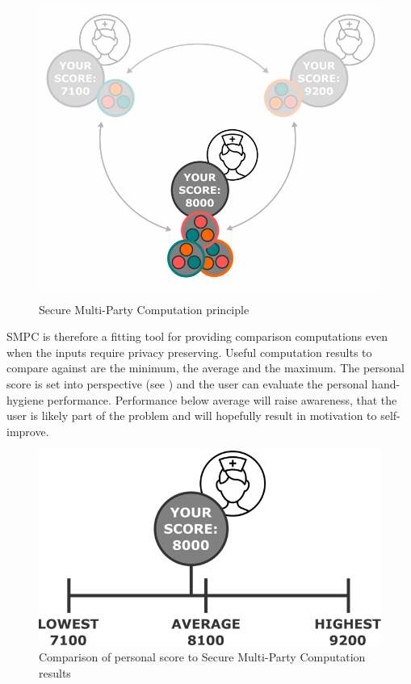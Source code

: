 \begin{figure}[!htb]
{		\includegraphics[scale=1.0]{figures/smpc_principle_e.png}
		\label{figure:Secure Multi-Party Computation principle - e}
	}%
	\hfill

	\caption{Secure Multi-Party Computation principle\protect\footnotemark} \label{figure:Secure Multi-Party Computation principle}
\end{figure}


\gls{SMPC} is therefore a fitting tool for providing comparison computations even when the inputs require privacy preserving. Useful computation results to compare against are the minimum, the average and the maximum. The personal score is set into perspective (see ) and the user can evaluate the personal hand-hygiene performance. Performance below average will raise awareness, that the user is likely part of the problem and will hopefully result in motivation to self-improve.

\begin{figure}[!htb] %
	\caption[Comparison of SMPC result and personal score]{Comparison of personal score to Secure Multi-Party Computation results} \label{figure:Secure Multi-Party Computation principle result}
	\includegraphics[scale=1.0]{figures/smpc_principle_result.png}
\end{figure}

